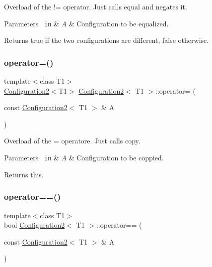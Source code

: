 Overload of the != operator. Just calls {\ttfamily equal} and negates it. 


\begin{DoxyParams}[1]{Parameters}
\mbox{\texttt{ in}}  & {\em A} & Configuration to be equalized. \\
\hline
\end{DoxyParams}
\begin{DoxyReturn}{Returns}
true if the two configurations are different, false otherwise. 
\end{DoxyReturn}
\mbox{\label{class_configuration2_a9ef2f57ddcc1f0c8117a9ed2f13141aa}} 
\subsubsection{\texorpdfstring{operator=()}{operator=()}}
{\footnotesize\ttfamily template$<$class T1$>$ \\
\mbox{\hyperlink{class_configuration2}{Configuration2}}$<$T1$>$ \mbox{\hyperlink{class_configuration2}{Configuration2}}$<$ T1 $>$\+::operator= (\begin{DoxyParamCaption}\item[{const \mbox{\hyperlink{class_configuration2}{Configuration2}}$<$ T1 $>$ \&}]{A }\end{DoxyParamCaption})\hspace{0.3cm}{\ttfamily [inline]}}



Overload of the = operatore. Just calls {\ttfamily copy}. 


\begin{DoxyParams}[1]{Parameters}
\mbox{\texttt{ in}}  & {\em A} & Configuration to be coppied. \\
\hline
\end{DoxyParams}
\begin{DoxyReturn}{Returns}
this. 
\end{DoxyReturn}
\mbox{\label{class_configuration2_a7dda6b86ded2376a78a7f3d9f2811740}} 
\subsubsection{\texorpdfstring{operator==()}{operator==()}}
{\footnotesize\ttfamily template$<$class T1$>$ \\
bool \mbox{\hyperlink{class_configuration2}{Configuration2}}$<$ T1 $>$\+::operator== (\begin{DoxyParamCaption}\item[{const \mbox{\hyperlink{class_configuration2}{Configuration2}}$<$ T1 $>$ \&}]{A }\end{DoxyParamCaption})\hspace{0.3cm}{\ttfamily [inline]}}




